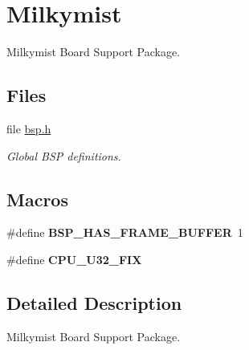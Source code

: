 \hypertarget{group__RTEMSBSPsLM32Milkymist}{}\section{Milkymist}
\label{group__RTEMSBSPsLM32Milkymist}


Milkymist Board Support Package.  


\subsection*{Files}
\begin{DoxyCompactItemize}
\item 
file \mbox{\hyperlink{bsps_2lm32_2milkymist_2include_2bsp_8h}{bsp.\+h}}
\begin{DoxyCompactList}\small\item\em Global B\+SP definitions. \end{DoxyCompactList}\end{DoxyCompactItemize}
\subsection*{Macros}
\begin{DoxyCompactItemize}
\item 
\mbox{\label{group__RTEMSBSPsLM32Milkymist_ga18988f05911c2a1adcea89019029280b}} 
\#define {\bfseries B\+S\+P\+\_\+\+H\+A\+S\+\_\+\+F\+R\+A\+M\+E\+\_\+\+B\+U\+F\+F\+ER}~1
\item 
\mbox{\label{group__RTEMSBSPsLM32Milkymist_ga297f1089f8c3b2b983edbec44c96479d}} 
\#define {\bfseries C\+P\+U\+\_\+\+U32\+\_\+\+F\+IX}
\end{DoxyCompactItemize}


\subsection{Detailed Description}
Milkymist Board Support Package. 

